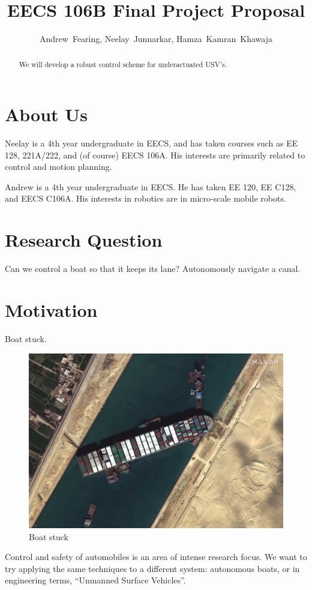 \documentclass[conference]{IEEEtran}
\begin{document}
\title{EECS 106B Final Project Proposal}
\author{Andrew~Fearing, Neelay~Junnarkar,  Hamza~Kamran~Khawaja}
\maketitle


\begin{abstract}
We will develop a robust control scheme for underactuated USV's.
\end{abstract}


\section{About Us}
Neelay is a 4th year undergraduate in EECS, and has taken courses such as EE 128, 221A/222, and (of course) EECS 106A. His interests are primarily related to control and motion planning.

Andrew is a 4th year undergraduate in EECS. He has taken EE 120, EE C128, and EECS C106A. His interests in robotics are in micro-scale mobile robots.
\section{Research Question}
Can we control a boat so that it keeps its lane? Autonomously navigate a canal.
\section{Motivation}
Boat stuck.
\begin{figure}
    \centering
    \includegraphics{documents/proposal/Suez_Canal_blocked_by_Ever_Given_March_27_2021.jpg}
    \caption{Boat stuck\label{fig:boat_stuck}}
\end{figure}
Control and safety of automobiles is an area of intense research focus. We want to try applying the same techniques to a different system: autonomous boats, or in engineering terms, \enquote{Unmanned Surface Vehicles}.
\end{document}
